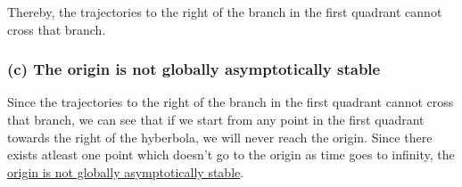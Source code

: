 Thereby, the trajectories to the right of the branch in the first quadrant cannot cross that branch.

\subsubsection*{(c) The origin is not globally asymptotically stable}

Since the trajectories to the right of the branch in the first quadrant cannot cross that branch, we can see that if we start from any point in the first quadrant towards the right of the hyberbola, we will never reach the origin.
Since there exists atleast one point which doesn't go to the origin as time goes to infinity, the
\underline{origin is not globally asymptotically stable}.
